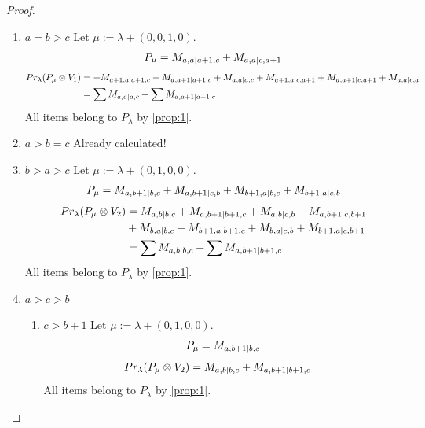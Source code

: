 \documentclass[12pt,a4paper]{article}
\begin{document}
\begin{proof}
\begin{enumerate}
\item $a=b>c$
        Let $\mu:=\lambda + (0,0,1,0) $. 
\begin{equation}\notag
  \begin{aligned}
      P_{\mu} =
M_{a,a|a+1,c}
+M_{a,a|c,a+1}
  \end{aligned}
\end{equation}
\begin{equation}\notag
  \begin{aligned}
  Pr_{\lambda}(P_\mu \otimes V_1) &=
+M_{a+1,a|a+1,c}
+M_{a,a+1|a+1,c}
+M_{a,a|a,c} 
+M_{a+1,a|c,a+1}
+M_{a,a+1|c,a+1}
+M_{a,a|c,a} \\
                                  &=
\sum M_{a,a|a,c}
+\sum M_{a,a+1|a+1,c}
  \end{aligned}
\end{equation}
All items belong to $P_\lambda$ by \cref{prop:1}.

\item $a>b=c$ Already calculated!

\item $b>a>c$
        Let $\mu:=\lambda + (0,1,0,0) $. 
\begin{equation}\notag
  \begin{aligned}
      P_{\mu} =
M_{a,b+1|b,c}
+M_{a,b+1|c,b}
+M_{b+1,a|b,c}
+M_{b+1,a|c,b}
  \end{aligned}
\end{equation}
\begin{equation}\notag
  \begin{aligned}
  Pr_{\lambda}(P_\mu \otimes V_2) &=
M_{a,b|b,c}
+M_{a,b+1|b+1,c}
+M_{a,b|c,b}
+M_{a,b+1|c,b+1} \\
                                  &+
M_{b,a|b,c}
+M_{b+1,a|b+1,c}
+M_{b,a|c,b}
+M_{b+1,a|c,b+1}\\
                                  &=
\sum M_{a,b|b,c}
+\sum M_{a,b+1|b+1,c}
  \end{aligned}
\end{equation}
All items belong to $P_\lambda$ by \cref{prop:1}.

\item $a>c>b$
\begin{enumerate}
  \item $c>b+1$
        Let $\mu:=\lambda + (0,1,0,0) $. 
\begin{equation}\notag
  \begin{aligned}
      P_{\mu} =
M_{a,b+1|b,c}
  \end{aligned}
\end{equation}
\begin{equation}\notag
  \begin{aligned}
  Pr_{\lambda}(P_\mu \otimes V_2) &=
M_{a,b|b,c}
+M_{a,b+1|b+1,c}
  \end{aligned}
\end{equation}
All items belong to $P_\lambda$ by \cref{prop:1}.


\end{enumerate}
\end{enumerate}
\end{proof}
\end{document}
